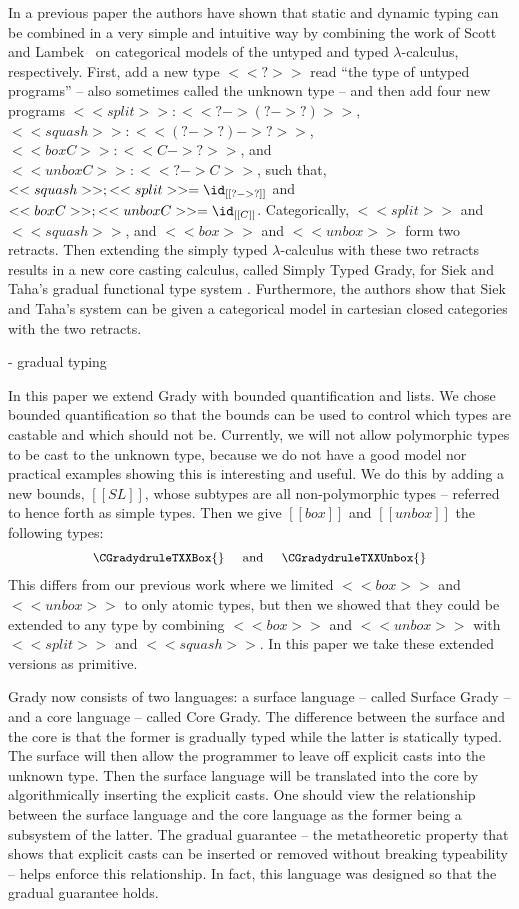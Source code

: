 In a previous paper the authors \cite{Eades:2017} have shown that
static and dynamic typing can be combined in a very simple and
intuitive way by combining the work of Scott~\cite{Scott:1980} and
Lambek~\cite{Lambek:1980} on categorical models of the untyped and
typed $\lambda$-calculus, respectively.  First, add a new type $<<?>>$
read ``the type of untyped programs'' -- also sometimes called the
unknown type -- and then add four new programs
$<<split>> : <<? -> (? -> ?)>>$, $ <<squash>> : <<(? -> ?) -> ?>> $,
$<<box C>> : <<C -> ?>>$, and $<<unbox C>> : <<? -> C>>$, such that,
$<<squash>>;<<split>> = \id_{[[? -> ?]]}$ and
$<<box C>>;<<unbox C>> = \id_{[[C]]}$.
Categorically, $<<split>>$ and $<<squash>>$, and $<<box>>$ and
$<<unbox>>$ form two retracts.  Then extending the simply typed
$\lambda$-calculus with these two retracts results in a new core
casting calculus, called Simply Typed Grady, for Siek and Taha's
gradual functional type system \cite{Siek:2015}.  Furthermore, the
authors show that Siek and Taha's system can be given a categorical
model in cartesian closed categories with the two retracts.

- gradual typing

In this paper we extend Grady with bounded quantification and lists.
We chose bounded quantification so that the bounds can be used to
control which types are castable and which should not be.  Currently,
we will not allow polymorphic types to be cast to the unknown type,
because we do not have a good model nor practical examples showing
this is interesting and useful.  We do this by adding a new bounds,
$[[SL]]$, whose subtypes are all non-polymorphic types -- referred to
hence forth as simple types.  Then we give $[[box]]$ and $[[unbox]]$
the following types:
\[\small
\begin{array}{lll}
  \CGradydruleTXXBox{} & \text{ and } & \CGradydruleTXXUnbox{}
\end{array}
\]
This differs from our previous work where we limited $<<box>>$ and
$<<unbox>>$ to only atomic types, but then we showed that they could
be extended to any type by combining $<<box>>$ and $<<unbox>>$ with
$<<split>>$ and $<<squash>>$.  In this paper we take these extended
versions as primitive.

Grady now consists of two languages: a surface language -- called
Surface Grady -- and a core language -- called Core Grady. The
difference between the surface and the core is that the former is
gradually typed while the latter is statically typed.  The surface
will then allow the programmer to leave off explicit casts into the
unknown type.  Then the surface language will be translated into the
core by algorithmically inserting the explicit casts.  One should view
the relationship between the surface language and the core language
as the former being a subsystem of the latter.  The gradual guarantee
-- the metatheoretic property that shows that explicit casts can be
inserted or removed without breaking typeability -- helps enforce this
relationship.  In fact, this language was designed so that the gradual
guarantee holds.

